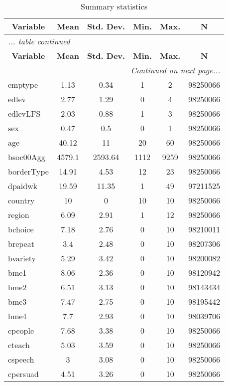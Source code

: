 

\begin{center}
\begin{longtable}{l c c c c c}
\caption{Summary statistics \label{sumstat}}\\
\hline\hline\multicolumn{1}{c}{\textbf{Variable}}
 &\textbf{Mean}
 & \textbf{Std. Dev.}& \textbf{Min.} &  \textbf{Max.} & \textbf{N} \\ \hline
\endfirsthead
\multicolumn{6}{l}{\emph{... table \thetable{} continued}}
\\ \hline\hline\multicolumn{1}{c}{\textbf{Variable}}
 & \textbf{Mean}
 & \textbf{Std. Dev.}& \textbf{Min.} &  \textbf{Max.} & \textbf{N} \\ \hline
\endhead
\hline
\multicolumn{6}{r}{\emph{Continued on next page...}}\\
\endfoot
\endlastfoot
emptype & 1.13 & 0.34 & 1 & 2 & 98250066\\
edlev & 2.77 & 1.29 & 0 & 4 & 98250066\\
edlevLFS & 2.03 & 0.88 & 1 & 3 & 98250066\\
sex & 0.47 & 0.5 & 0 & 1 & 98250066\\
age & 40.12 & 11 & 20 & 60 & 98250066\\
bsoc00Agg & 4579.1 & 2593.64 & 1112 & 9259 & 98250066\\
borderType & 14.91 & 4.53 & 12 & 23 & 98250066\\
dpaidwk & 19.59 & 11.35 & 1 & 49 & 97211525\\
country & 10 & 0 & 10 & 10 & 98250066\\
region & 6.09 & 2.91 & 1 & 12 & 98250066\\
bchoice & 7.18 & 2.76 & 0 & 10 & 98210011\\
brepeat & 3.4 & 2.48 & 0 & 10 & 98207306\\
bvariety & 5.29 & 3.42 & 0 & 10 & 98200082\\
bme1 & 8.06 & 2.36 & 0 & 10 & 98120942\\
bme2 & 6.51 & 3.13 & 0 & 10 & 98143434\\
bme3 & 7.47 & 2.75 & 0 & 10 & 98195442\\
bme4 & 7.7 & 2.93 & 0 & 10 & 98039706\\
cpeople & 7.68 & 3.38 & 0 & 10 & 98250066\\
cteach & 5.03 & 3.59 & 0 & 10 & 98250066\\
cspeech & 3 & 3.08 & 0 & 10 & 98250066\\
cpersuad & 4.51 & 3.26 & 0 & 10 & 98250066\\

\end{longtable}
\end{center}

